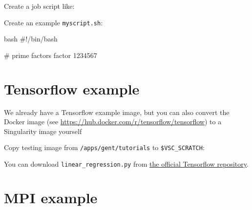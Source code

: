 \begin{prompt}
\end{prompt}

Create a job script like:


Create an example \lstinline|myscript.sh|:

\begin{code}{bash}
#!/bin/bash

# prime factors
factor 1234567
\end{code}

\section{Tensorflow example}

We already have a Tensorflow example image, but you can also convert the Docker
image (see \url{https://hub.docker.com/r/tensorflow/tensorflow}) to a Singularity image yourself

Copy testing image from \lstinline|/apps/gent/tutorials| to \lstinline|$VSC_SCRATCH|:

\begin{prompt}
\end{prompt}


You can download \lstinline|linear_regression.py| from
\href{https://github.com/tensorflow/tensorflow/blob/master/tensorflow/examples/get_started/regression/linear_regression.py}{the official Tensorflow repository}.

\section{MPI example}

